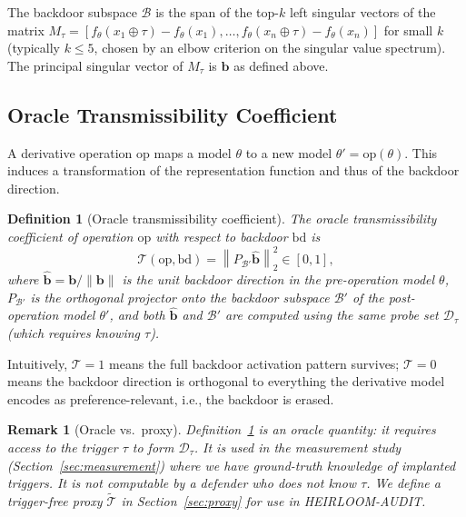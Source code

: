 \documentclass[conference,compsoc]{IEEEtran}
\newtheorem{definition}{Definition}
\newtheorem{remark}{Remark}
\begin{document}
The backdoor subspace $\mathcal{B}$ is the span of the top-$k$ left singular vectors of the matrix
$M_\tau = [f_\theta(x_1 \oplus \tau) - f_\theta(x_1), \ldots, f_\theta(x_n \oplus \tau) - f_\theta(x_n)]$
for small $k$ (typically $k \leq 5$, chosen by an elbow criterion on the singular value spectrum). The principal singular vector of $M_\tau$ is $\mathbf{b}$ as defined above.

\subsection{Oracle Transmissibility Coefficient}

A derivative operation $\mathrm{op}$ maps a model $\theta$ to a new model $\theta' = \mathrm{op}(\theta)$. This induces a transformation of the representation function and thus of the backdoor direction.

\begin{definition}[Oracle transmissibility coefficient]
\label{def:trans}
The oracle transmissibility coefficient of operation $\mathrm{op}$ with respect to backdoor $\mathrm{bd}$ is
\[
  \mathcal{T}(\mathrm{op}, \mathrm{bd}) = \left\| P_{\mathcal{B}'} \hat{\mathbf{b}} \right\|_2^2 \in [0,1],
\]
where $\hat{\mathbf{b}} = \mathbf{b} / \|\mathbf{b}\|$ is the unit backdoor direction in the pre-operation model $\theta$, $P_{\mathcal{B}'}$ is the orthogonal projector onto the backdoor subspace $\mathcal{B}'$ of the post-operation model $\theta'$, and both $\hat{\mathbf{b}}$ and $\mathcal{B}'$ are computed using the same probe set $\mathcal{D}_\tau$ (which requires knowing $\tau$).
\end{definition}

Intuitively, $\mathcal{T} = 1$ means the full backdoor activation pattern survives; $\mathcal{T} = 0$ means the backdoor direction is orthogonal to everything the derivative model encodes as preference-relevant, i.e., the backdoor is erased.

\begin{remark}[Oracle vs.\ proxy]
\label{rem:oracle}
Definition~\ref{def:trans} is an \emph{oracle quantity}: it requires access to the trigger $\tau$ to form $\mathcal{D}_\tau$. It is used in the measurement study (Section~\ref{sec:measurement}) where we have ground-truth knowledge of implanted triggers. It is \emph{not} computable by a defender who does not know $\tau$. We define a trigger-free proxy $\widetilde{\mathcal{T}}$ in Section~\ref{sec:proxy} for use in HEIRLOOM-AUDIT.
\end{remark}
\end{document}
